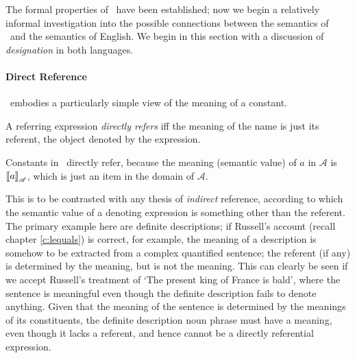 The formal properties of \ltwo\ have been established; now we begin a relatively informal investigation into the possible connections between the semantics of \ltwo\ and the semantics of English.
We begin in this section with a discussion of \emph{designation} in both languages.

\paragraph{Direct Reference}
\ltwo\ embodies a particularly simple view of the meaning of a constant.
 \begin{definition}
 	A referring expression \emph{directly refers} iff the meaning of the name is just its referent, the object denoted by the expression.
 \end{definition}	
Constants in \ltwo\ directly refer, because the meaning (semantic value) of $a$ in $\mathscr{A}$ is $\left\llbracket a\right\rrbracket_{\mathscr{A}}$, which is just an item in the domain of $\mathscr{A}$.


This is to be contrasted with any thesis of \emph{indirect} reference, according to which the semantic value of a denoting expression is something other than the referent. The primary example here are definite descriptions; if Russell's account (recall chapter \ref{c:lequals}) is correct, for example,  the meaning of a description is somehow to be extracted from a complex quantified sentence; the referent (if any) is determined by the meaning, but is not the meaning. This can clearly be seen if we accept Russell's treatment of ‘The present king of France is bald’, where the sentence is meaningful even though the definite description fails to denote anything. Given that the meaning of the sentence is determined by the meanings of its constituents, the definite description noun phrase must have a meaning, even though it lacks a referent, and hence cannot be a directly referential expression.



